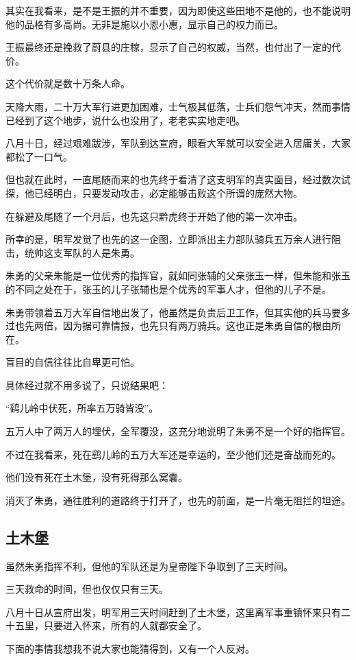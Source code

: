\begin{multicols}{\theparacolNo}
其实在我看来，是不是王振的并不重要，因为即使这些田地不是他的，也不能说明他的品格有多高尚。无非是施以小恩小惠，显示自己的权力而已。

王振最终还是挽救了蔚县的庄稼，显示了自己的权威，当然，也付出了一定的代价。

这个代价就是数十万条人命。

天降大雨，二十万大军行进更加困难，士气极其低落，士兵们怨气冲天，然而事情已经到了这个地步，说什么也没用了，老老实实地走吧。

八月十日，经过艰难跋涉，军队到达宣府，眼看大军就可以安全进入居庸关，大家都松了一口气。

但也就在此时，一直尾随而来的也先终于看清了这支明军的真实面目，经过数次试探，他已经明白，只要发动攻击，必定能够击败这个所谓的庞然大物。

在躲避及尾随了一个月后，也先这只黔虎终于开始了他的第一次冲击。

所幸的是，明军发觉了也先的这一企图，立即派出主力部队骑兵五万余人进行阻击，统帅这支军队的人是朱勇。

朱勇的父亲朱能是一位优秀的指挥官，就如同张辅的父亲张玉一样，但朱能和张玉的不同之处在于，张玉的儿子张辅也是个优秀的军事人才，但他的儿子不是。

朱勇带领着五万大军自信地出发了，他虽然是负责后卫工作，但其实他的兵马要多过也先两倍，因为据可靠情报，也先只有两万骑兵。这也正是朱勇自信的根由所在。

盲目的自信往往比自卑更可怕。

具体经过就不用多说了，只说结果吧：

“鹞儿岭中伏死，所率五万骑皆没”。

五万人中了两万人的埋伏，全军覆没，这充分地说明了朱勇不是一个好的指挥官。

不过在我看来，死在鹞儿岭的五万大军还是幸运的，至少他们还是奋战而死的。

他们没有死在土木堡，没有死得那么窝囊。

消灭了朱勇，通往胜利的道路终于打开了，也先的前面，是一片毫无阻拦的坦途。

\subsection{土木堡}
虽然朱勇指挥不利，但他的军队还是为皇帝陛下争取到了三天时间。

三天救命的时间，但也仅仅只有三天。

八月十日从宣府出发，明军用三天时间赶到了土木堡，这里离军事重镇怀来只有二十五里，只要进入怀来，所有的人就都安全了。

下面的事情我想我不说大家也能猜得到，又有一个人反对。


\end{multicols}

